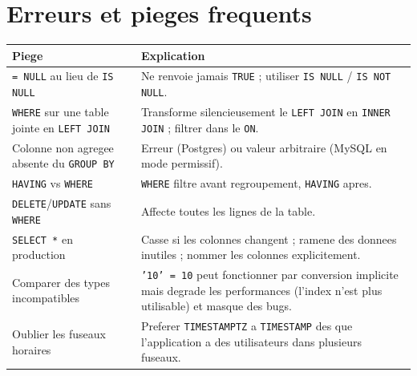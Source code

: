 \documentclass[11pt,a4paper]{article}
\begin{document}
\section{Erreurs et pieges frequents}
\renewcommand{\arraystretch}{1.35}
\begin{longtable}{>{\raggedright\arraybackslash}p{4.6cm}
                  >{\raggedright\arraybackslash}p{8.2cm}}
\rowcolor{primary}
\textbf{\color{white}Piege} & \textbf{\color{white}Explication} \\
\hline
\texttt{= NULL} au lieu de \texttt{IS NULL} & Ne renvoie jamais \texttt{TRUE} ;
utiliser \texttt{IS NULL} / \texttt{IS NOT NULL}. \\
\texttt{WHERE} sur une table jointe en \texttt{LEFT JOIN} & Transforme
silencieusement le \texttt{LEFT JOIN} en \texttt{INNER JOIN} ; filtrer dans le
\texttt{ON}. \\
Colonne non agregee absente du \texttt{GROUP BY} & Erreur (Postgres) ou valeur
arbitraire (MySQL en mode permissif). \\
\texttt{HAVING} vs \texttt{WHERE} & \texttt{WHERE} filtre avant regroupement,
\texttt{HAVING} apres. \\
\texttt{DELETE}/\texttt{UPDATE} sans \texttt{WHERE} & Affecte toutes les
lignes de la table. \\
\texttt{SELECT *} en production & Casse si les colonnes changent ; ramene des
donnees inutiles ; nommer les colonnes explicitement. \\
Comparer des types incompatibles & \texttt{'10' = 10} peut fonctionner par
conversion implicite mais degrade les performances (l'index n'est plus
utilisable) et masque des bugs. \\
Oublier les fuseaux horaires & Preferer \texttt{TIMESTAMPTZ} a
\texttt{TIMESTAMP} des que l'application a des utilisateurs dans plusieurs
fuseaux. \\
\end{longtable}

\end{document}
